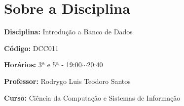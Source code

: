 \documentclass[12pt, a4paper]{article}
\begin{document}
\maketitle

\section{Sobre a Disciplina} \label{sec:disciplina}


\textbf{Disciplina:} Introdução a Banco de Dados

\textbf{Código:} DCC011

\textbf{Horários:} 3ª e 5ª - 19:00$\sim$20:40

\textbf{Professor:} Rodrygo Luis Teodoro Santos

\textbf{Curso:} Ciência da Computação e Sistemas de Informação








\begin{comment}
\subsection{Ementa e Programa da Disciplina} \label{subsec:ementa_e_programa}


\begin{itemize}
    \item \textbf{Curso:} Ciência da Computação e Sistemas de Informação;
    \item \textbf{Código:} DCC011;
    \item \textbf{Classificação:} OP;
    \item \textbf{Créditos:} 04;
    \item \textbf{Carga Horária:} (Teórica, Prática, Total) = (60, 00, 60);
    \item \textbf{Requisitos:} Não.
\end{itemize}
\end{comment}
\end{document}
